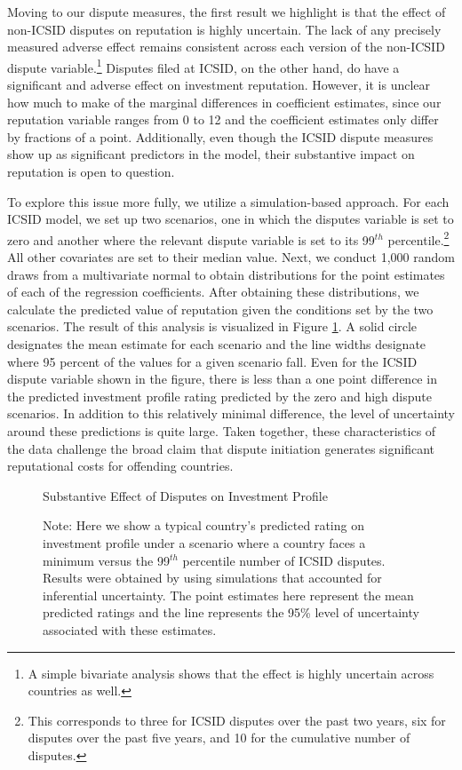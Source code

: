 \documentclass[12pt,onesided]{amsart}
\begin{document}
Moving to our dispute measures, the first result we highlight is that the effect of non-ICSID disputes on reputation is highly uncertain. The lack of any precisely measured adverse effect remains consistent across each version of the non-ICSID dispute variable.\footnote{A simple bivariate analysis shows that the effect is highly uncertain across countries as well.} Disputes filed at ICSID, on the other hand, do have a significant and adverse effect on investment reputation. However, it is unclear how much to make of the marginal differences in coefficient estimates, since our reputation variable ranges from 0 to 12 and the coefficient estimates only differ by fractions of a point. Additionally, even though the ICSID dispute measures show up as significant predictors in the model, their substantive impact on reputation is open to question. 

To explore this issue more fully, we utilize a simulation-based approach. For each ICSID model, we set up two scenarios, one in which the disputes variable is set to zero and another where the relevant dispute variable is set to its 99$^{th}$ percentile.\footnote{This corresponds to three for ICSID disputes over the past two years, six for disputes over the past five years, and 10 for the cumulative number of disputes.} All other covariates are set to their median value. Next, we conduct 1,000 random draws from a multivariate normal to obtain distributions for the point estimates of each of the regression coefficients. After obtaining these distributions, we calculate the predicted value of reputation given the conditions set by the two scenarios. The result of this analysis is visualized in Figure \ref{fig:subEffect}. A solid circle designates the mean estimate for each scenario and the line widths designate where 95 percent of the values for a given scenario fall. Even for the ICSID dispute variable shown in the figure, there is less than a one point difference in the predicted investment profile rating predicted by the zero and high dispute scenarios. In addition to this relatively minimal difference, the level of uncertainty around these predictions is quite large. Taken together, these characteristics of the data challenge the broad claim that dispute initiation generates significant reputational costs for offending countries.

\begin{figure}[ht]
	\centering
	\caption{Substantive Effect of Disputes on Investment Profile}
	\label{fig:subEffect}
	\resizebox{1\textwidth}{!}{}
	\caption*{Note: Here we show a typical country's predicted rating on investment profile under a scenario where a country faces a minimum versus the 99$^{th}$ percentile number of ICSID disputes. Results were obtained by using simulations that accounted for inferential uncertainty. The point estimates here represent the mean predicted ratings and the line represents the 95\% level of uncertainty associated with these estimates.}
\end{figure}
\FloatBarrier
\end{document}
